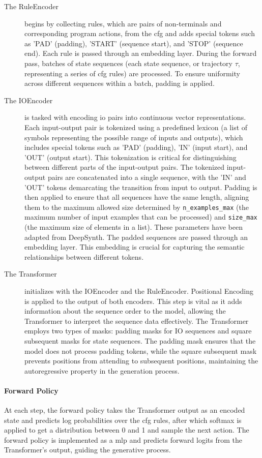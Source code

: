 \begin{description}
    \item[The RuleEncoder] begins by collecting rules, which are pairs of non-terminals and corresponding program actions, from the \acrshort{cfg} and adds special tokens such as 'PAD' (padding), 'START' (sequence start), and 'STOP' (sequence end). Each rule is passed through an embedding layer.
    During the forward pass, batches of state sequences (each state sequence, or trajectory $\tau$, representing a series of \acrshort{cfg} rules) are processed. To ensure uniformity across different sequences within a batch, padding is applied.
    \item[The IOEncoder] is tasked with encoding \acrfull{io} pairs into continuous vector representations.
    Each input-output pair is tokenized using a predefined lexicon (a list of symbols representing the possible range of inputs and outputs), which includes special tokens such as 'PAD' (padding), 'IN' (input start), and 'OUT' (output start). This tokenization is critical for distinguishing between different parts of the input-output pairs.
    The tokenized input-output pairs are concatenated into a single sequence, with the 'IN' and 'OUT' tokens demarcating the transition from input to output. Padding is then applied to ensure that all sequences have the same length, aligning them to the maximum allowed size determined by \texttt{n\_examples\_max} (the maximum number of input examples that can be processed) and \texttt{size\_max} (the maximum size of elements in a list). These parameters have been adapted from DeepSynth. The padded sequences are passed through an embedding layer. This embedding is crucial for capturing the semantic relationships between different tokens.
    \item[The Transformer] initializes with the IOEncoder and the RuleEncoder. Positional Encoding is applied to the output of both encoders. This step is vital as it adds information about the sequence order to the model, allowing the Transformer to interpret the sequence data effectively.
    The Transformer employs two types of masks: padding masks for IO sequences and square subsequent masks for state sequences. The padding mask ensures that the model does not process padding tokens, while the square subsequent mask prevents positions from attending to subsequent positions, maintaining the autoregressive property in the generation process.
\end{description}

\paragraph*{Forward Policy}
At each step, the forward policy takes the Transformer output as an encoded state and predicts log probabilities over the \acrshort{cfg} rules, after which softmax is applied to get a distribution between 0 and 1 and sample the next action. 
The forward policy is implemented as a \acrfull{mlp} and predicts forward logits from the Transformer's output, guiding the generative process.


